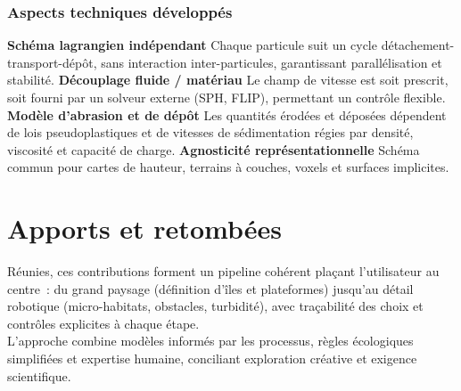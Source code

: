 \subsubsection*{Aspects techniques développés}
\begin{Itemize}
    \Item{} \textbf{Schéma lagrangien indépendant} Chaque particule suit un cycle détachement-transport-dépôt, sans interaction inter-particules, garantissant parallélisation et stabilité.
    \Item{} \textbf{Découplage fluide / matériau} Le champ de vitesse est soit prescrit, soit fourni par un solveur externe (SPH, FLIP), permettant un contrôle flexible.
    \Item{} \textbf{Modèle d'abrasion et de dépôt} Les quantités érodées et déposées dépendent de lois pseudoplastiques et de vitesses de sédimentation régies par densité, viscosité et capacité de charge.
    \Item{} \textbf{Agnosticité représentationnelle} Schéma commun pour cartes de hauteur, terrains à couches, voxels et surfaces implicites.
\end{Itemize}

\section*{Apports et retombées}
Réunies, ces contributions forment un pipeline cohérent plaçant l'utilisateur au centre~: du grand paysage (définition d'îles et plateformes) jusqu'au détail robotique (micro-habitats, obstacles, turbidité), avec traçabilité des choix et contrôles explicites à chaque étape. \\
L'approche combine modèles informés par les processus, règles écologiques simplifiées et expertise humaine, conciliant exploration créative et exigence scientifique. \\

